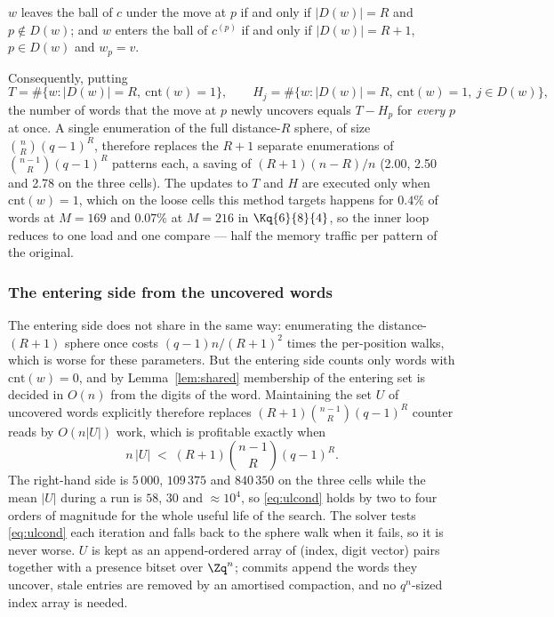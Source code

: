 \begin{lemma}\label{lem:shared}
$w$ leaves the ball of $c$ under the move at $p$ if and only if $|D(w)|=R$ and
$p\notin D(w)$; and $w$ enters the ball of $c^{(p)}$ if and only if
$|D(w)|=R+1$, $p\in D(w)$ and $w_p=v$.
\end{lemma}

Consequently, putting
\[
T=\#\{w: |D(w)|=R,\ \mathrm{cnt}(w)=1\},\qquad
H_j=\#\{w: |D(w)|=R,\ \mathrm{cnt}(w)=1,\ j\in D(w)\},
\]
the number of words that the move at $p$ newly uncovers equals $T-H_p$ for
\emph{every} $p$ at once. A single enumeration of the full distance-$R$
sphere, of size $\binom{n}{R}(q-1)^R$, therefore replaces the $R+1$ separate
enumerations of $\binom{n-1}{R}(q-1)^R$ patterns each, a saving of
$(R+1)(n-R)/n$ (2.00, 2.50 and 2.78 on the three cells). The updates to $T$
and $H$ are executed only when $\mathrm{cnt}(w)=1$, which on the loose cells
this method targets happens for $0.4\%$ of words at $M=169$ and $0.07\%$ at
$M=216$ in $\Kq{6}{8}{4}$, so the inner loop reduces to one load and one
compare --- half the memory traffic per pattern of the original.

\subsubsection*{The entering side from the uncovered words}

The entering side does not share in the same way: enumerating the
distance-$(R+1)$ sphere once costs $(q-1)n/(R+1)^2$ times the per-position
walks, which is worse for these parameters. But the entering side counts only
words with $\mathrm{cnt}(w)=0$, and by Lemma~\ref{lem:shared} membership of
the entering set is decided in $O(n)$ from the digits of the word. Maintaining
the set $U$ of uncovered words explicitly therefore replaces
$(R+1)\binom{n-1}{R}(q-1)^R$ counter reads by $O(n|U|)$ work, which is
profitable exactly when
\begin{equation}\label{eq:ulcond}
n\,|U| \;<\; (R+1)\binom{n-1}{R}(q-1)^R .
\end{equation}
The right-hand side is $5\,000$, $109\,375$ and $840\,350$ on the three cells
while the mean $|U|$ during a run is $58$, $30$ and ${\approx}10^4$, so
\eqref{eq:ulcond} holds by two to four orders of magnitude for the whole
useful life of the search. The solver tests \eqref{eq:ulcond} each iteration
and falls back to the sphere walk when it fails, so it is never worse.
$U$ is kept as an append-ordered array of (index, digit vector) pairs together
with a presence bitset over $\Zq^n$; commits append the words they uncover,
stale entries are removed by an amortised compaction, and no $q^n$-sized index
array is needed.

